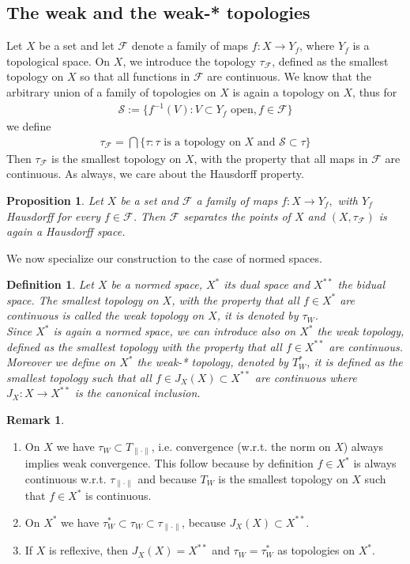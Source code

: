 \documentclass[11pt,a4paper]{article}
\newtheorem{prop}{Proposition}[section]
\newtheorem{defn}{Definition}[section]
\theoremstyle{definition}
\newtheorem{rem}{Remark}[section]
\begin{document}
\subsection{The weak and the weak-* topologies}
Let $X$ be a set and let $\mathcal{F}$ denote a family of maps $f: X \to Y_f$, where $Y_f$ is a topological space. On $X$, we introduce the topology $\tau_\mathcal{F}$, defined as the smallest topology on $X$ so that all functions in $\mathcal{F}$ are continuous. We know that the arbitrary union of a family of topologies on $X$ is again a topology on $X$, thus for 
\begin{align*}
\mathcal{S}:= \lbrace f^{-1}(V): V \subset Y_f \text{ open}, f \in \mathcal{F} \rbrace
\end{align*}
we define
\begin{align*}
\tau_\mathcal{F} = \bigcap \lbrace \tau : \tau \text{ is a topology on $X$ and $\mathcal{S} \subset \tau$} \rbrace 
\end{align*}
Then $\tau_\mathcal{F}$ is the smallest topology on $X$, with the property that all maps in $\mathcal{F}$ are continuous. As always, we care about the Hausdorff property. 
\begin{prop} Let $X$ be a set and $\mathcal{F}$ a family of maps $f: X \to Y_f,$ with $Y_f$ Hausdorff for every $f \in \mathcal{F}$. Then $\mathcal{F}$ separates the points of $X$ and $(X, \tau_\mathcal{F})$ is again a Hausdorff space. 
\end{prop}
\noindent We now specialize our construction to the case of normed spaces.
\begin{defn} Let $X$ be a normed space, $X^*$ its dual space and $X^{**}$ the bidual space. The smallest topology on $X$, with the property that all $f \in X^*$ are continuous is called the weak topology on $X$, it is denoted by $\tau_W$. \\
Since $X^*$ is again a normed space, we can introduce also on $X^*$ the weak topology, defined as the smallest topology with the property that all $f \in X^{**}$ are continuous. Moreover we define on $X^*$ the weak-* topology, denoted by $T_W^*$, it is defined as the smallest topology such that all $f \in J_X(X) \subset X^{**}$ are continuous where $J_X:X \to X^{**}$ is the canonical inclusion. 
\end{defn}
\begin{rem} \
\begin{enumerate}
\item On $X$ we have $\tau_W \subset T_{ \| \cdot \|}$, i.e. convergence (w.r.t. the norm on $X$) always implies weak convergence. This follow because by definition $f \in X^*$ is always continuous w.r.t. $\tau_{\| \cdot\|}$ and because $T_W$ is the smallest topology on $X$ such that $f \in X^*$ is continuous. 
\item On $X^*$ we have $\tau_W^* \subset \tau_W \subset \tau_{\| \cdot \|}$, because $J_X(X) \subset X^{**}$. 
\item If $X$ is reflexive, then $J_X(X) = X^{**}$ and $\tau_W= \tau_W^*$ as topologies on $X^*$. 
\end{enumerate}
\end{rem}
\end{document}
